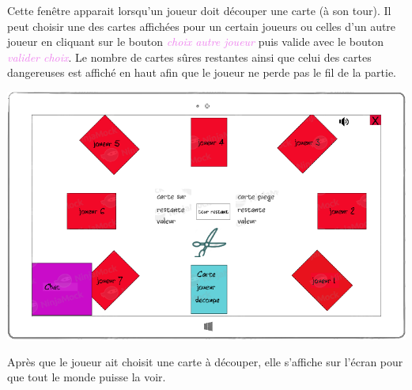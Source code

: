 \documentclass[a4paper]{article}
\let\oldtextit\textit
\renewcommand{\textit}[1]{\textcolor{violet}{\oldtextit{#1}}}
\begin{document}
Cette fenêtre apparait lorsqu'un joueur doit découper une carte (à son tour). Il peut choisir une des cartes affichées pour un certain joueurs ou celles d'un autre joueur en cliquant sur le bouton \textit{choix autre joueur} puis valide avec le bouton \textit{valider choix}. Le nombre de cartes sûres restantes ainsi que celui des cartes dangereuses est affiché en haut afin que le joueur ne perde pas le fil de la partie.

\begin{center}
    \includegraphics[scale=2]{img/choix_joueur_carte_defausse.png}
\end{center}

Après que le joueur ait choisit une carte à découper, elle s'affiche sur l'écran pour que tout le monde puisse la voir.
\end{document}
